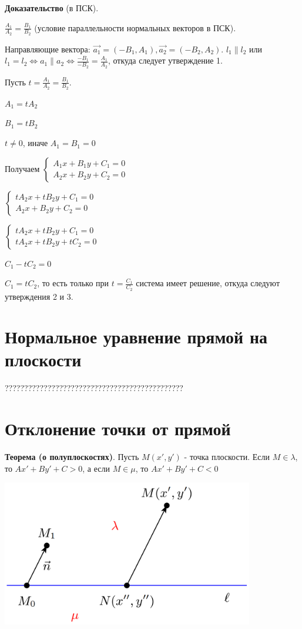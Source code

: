 \documentclass[a4paper]{article}
\begin{document}
\textbf{Доказательство} (в ПСК).

$\displaystyle \frac{A_1}{A_2} = \frac{B_1}{B_2}$ (условие параллельности нормальных векторов в ПСК). 

Направляющие вектора: $\vec{a_1} = (-B_1, A_1), \vec{a_2} = (-B_2, A_2)$. \newline $l_1 \parallel l_2$ или $\displaystyle l_1 = l_2 \Leftrightarrow a_1 \parallel a_2 \Leftrightarrow \frac{-B_1}{-B_2} = \frac{A_1}{A_2}$, откуда следует утверждение 1.

Пусть $t = \frac{A_1}{A_2} = \frac{B_1}{B_2}$. 

$A_1 = tA_2$

$B_1 = tB_2$

$t \neq 0$, иначе $A_1 = B_1 = 0$

Получаем $
\begin{cases}
   A_1x+B_1y+C_1 = 0
   \\
   A_2x + B_2y+C_2 = 0
 \end{cases}
$

$
\begin{cases}
   tA_2x+tB_2y+C_1 = 0
   \\
   A_2x + B_2y+C_2 = 0
 \end{cases}
$

$
\begin{cases}
   tA_2x+tB_2y+C_1 = 0
   \\
   tA_2x + tB_2y+tC_2 = 0
 \end{cases}
$

$C_1 - tC_2 = 0$

$C_1 = tC_2$, то есть только при $\displaystyle t=\frac{C_1}{C_2}$ система имеет решение, откуда следуют утверждения 2 и 3.

\section*{Нормальное уравнение прямой на плоскости}
??????????????????????????????????????????????

\section*{Отклонение точки от прямой}
\textbf{Теорема (о полуплоскостях)}. Пусть $M(x', y')$ - точка плоскости. Если $M \in \lambda$, то $Ax' + By' + C > 0$, а если $M \in \mu $, то $Ax' + By' + C < 0$ 

\includegraphics[width=11cm]{t7}
\end{document}

